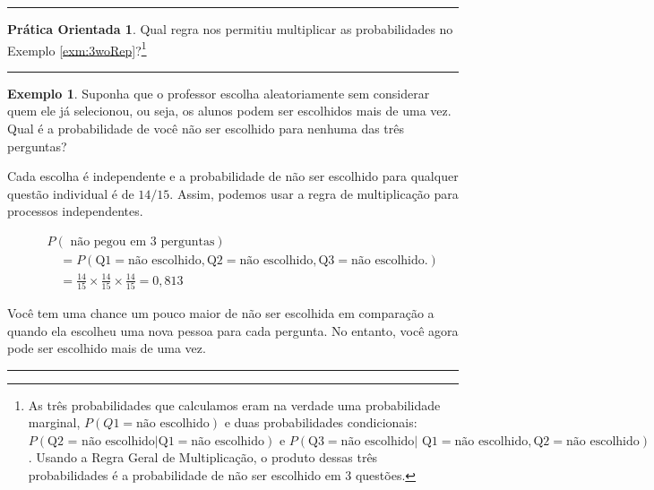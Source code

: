 \documentclass[
]{book}
\theoremstyle{definition}
\theoremstyle{definition}
\newtheorem{example}{Exemplo}[chapter]
\theoremstyle{definition}
\newtheorem{exercise}{Prática Orientada}[chapter]
\theoremstyle{definition}
\theoremstyle{remark}
\begin{document}
\begin{center}\rule{0.5\linewidth}{0.5pt}\end{center}

\begin{exercise}
\protect\hypertarget{exr:unnamed-chunk-69}{}{\label{exr:unnamed-chunk-69} }Qual regra nos permitiu multiplicar as probabilidades no Exemplo \ref{exm:3woRep}?\footnote{As três probabilidades que calculamos eram na verdade uma probabilidade marginal, \(P(Q1 = \text{não escolhido})\) e duas probabilidades condicionais: \(P(\text{Q2 = não escolhido} |\text{Q1} = \text{não escolhido}) \text{ e } P(\text{Q3} = \text{não escolhido} |\text{ Q1} = \text{não escolhido}, \text{Q2} = \text{não escolhido})\). Usando a Regra Geral de Multiplicação, o produto dessas três probabilidades é a probabilidade de não ser escolhido em 3 questões.}
\end{exercise}

\begin{center}\rule{0.5\linewidth}{0.5pt}\end{center}

\begin{example}
\protect\hypertarget{exm:3wRep}{}{\label{exm:3wRep} }Suponha que o professor escolha aleatoriamente sem considerar quem ele já selecionou, ou seja, os alunos podem ser escolhidos mais de uma vez. Qual é a probabilidade de você não ser escolhido para nenhuma das três perguntas?
\end{example}

Cada escolha é independente e a probabilidade de não ser escolhido para qualquer questão individual é de \(14/15\). Assim, podemos usar a regra de multiplicação para processos independentes.

\begin{eqnarray*}
&&P(\text{ não pegou em 3 perguntas}) \\
&&\quad = P(\text{Q1} = \text{não escolhido}, \text{Q2} = \text{não escolhido}, \text{Q3} = \text{não escolhido}.) \\
&&\quad = \frac{14}{15}\times\frac{14}{15}\times\frac{14}{15} = 0,813
\end{eqnarray*}

Você tem uma chance um pouco maior de não ser escolhida em comparação a quando ela escolheu uma nova pessoa para cada pergunta. No entanto, você agora pode ser escolhido mais de uma vez.

\begin{center}\rule{0.5\linewidth}{0.5pt}\end{center}
\end{document}
